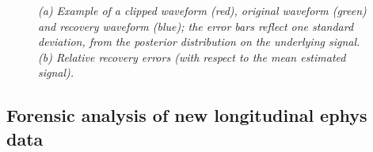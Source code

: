 \documentclass[journal]{IEEEtran}
\begin{document}

\begin{figure}[!htbp]
\centering

  \caption{\small \emph{ (a) Example of a clipped waveform (red), original waveform (green) and
  recovery waveform (blue); the error bars reflect one standard deviation, from the posterior distribution on the underlying signal. (b) Relative recovery errors (with respect to the mean estimated signal).
   }}
\end{figure}

%
%


\subsection{Forensic analysis of new longitudinal ephys data\label{sec:forensics}}
\end{document}
